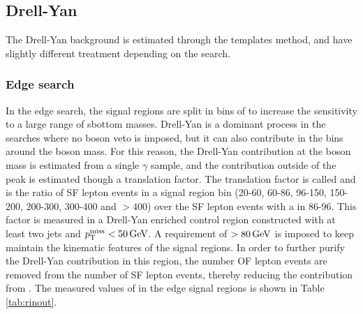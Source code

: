 \subsection*{Drell-Yan}
\noindent\justify
The Drell-Yan background is estimated through the \ptmiss templates method, and have slightly different treatment depending on the search. 
\subsubsection*{Edge search}
\noindent\justify
In the edge search, the signal regions are split in bins of \mll to increase the sensitivity to a large range of sbottom masses.
Drell-Yan is a dominant process in the searches where no \PZ boson veto is imposed, but it can also contribute in the \mll bins around the \PZ boson mass.
For this reason, the Drell-Yan contribution at the \PZ boson mass is estimated from a single $\gamma$ sample, and the contribution outside of the \PZ peak is estimated though a translation factor.
The translation factor is called \Routin and is the ratio of SF lepton events in a \mll signal region bin (20-60, 60-86, 96-150, 150-200, 200-300, 300-400 and $>400$\GeV) over the SF lepton events with a \mll in 86-96\GeV.
This factor is measured in a Drell-Yan enriched control region constructed with at least two jets and $p_{\mathrm{T}}^\text{miss}<50\,\text{Ge\hspace{-.08em}V}$.
A requirement of \mttwo$>80\,\text{Ge\hspace{-.08em}V}$ is imposed to keep maintain the kinematic features of the signal regions.
In order to further purify the Drell-Yan contribution in this region, the number OF lepton events are removed from the number of SF lepton events, thereby reducing the contribution from \ttbar.
The measured values of \Routin in the edge signal regions is shown in Table \ref{tab:rinout}.
